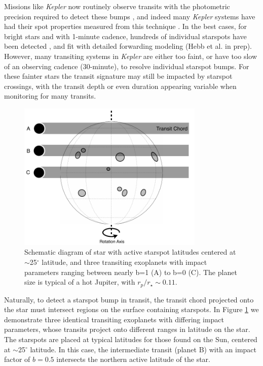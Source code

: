 \documentclass[preprint2]{aastex61}
\newcommand{\Kepler}{\textsl{Kepler}\xspace}
\begin{document}
Missions like \Kepler now routinely observe transits with the photometric precision required to detect these bumps \citep{borucki2010}, and indeed many \Kepler systems have had their spot properties measured from this technique \citep[e.g.][]{sanchis-ojeda2011, sanchis-ojeda2013}. In the best cases, for bright stars and with 1-minute cadence, hundreds of individual starspots have been detected \citep[e.g.][]{davenport_phd}, and fit with detailed forwarding modeling (Hebb et al. in prep). However, many transiting systems in \Kepler are either too faint, or have too slow of an observing cadence (30-minute), to resolve individual starspot bumps. For these fainter stars the transit signature may still be impacted by starspot crossings, with the transit depth or even duration appearing variable when monitoring for many transits.



\begin{figure}[!t]
\centering
\includegraphics[width=3.5in]{diagram1}
\caption{
Schematic diagram of star with active starspot latitudes centered at $\sim$25$^\circ$ latitude, and three transiting exoplanets with impact parameters ranging between nearly b=1 (A) to  b=0 (C). The planet size is typical of a hot Jupiter, with $r_p/r_\star\sim0.11$.
}
\label{fig:diagram1}
\end{figure}


Naturally, to detect a starspot bump in transit, the transit chord projected onto the star must intersect regions on the surface containing starspots. In Figure \ref{fig:diagram1} we demonstrate three identical transiting exoplanets with differing impact parameters, whose transits project onto different ranges in latitude on the star. The starspots are placed at typical latitudes for those found on the Sun, centered at $\sim$25$^\circ$ latitude. In this case, the intermediate transit (planet B) with an impact factor of $b=0.5$ intersects the northern active latitude of the star. 
\end{document}

